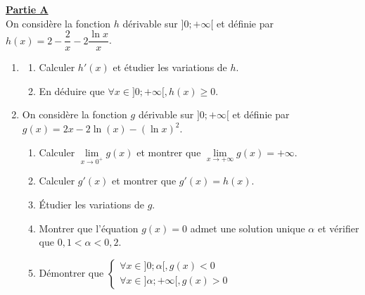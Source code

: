 \documentclass[12pt,a4paper]{article}
\begin{document}
\vspace{0.3cm}

\noindent \underline{\textbf{Partie A}} \\
On considère la fonction $h$ dérivable sur $]0; +\infty[$ et définie par $h(x) = 2 - \dfrac{2}{x} - 2\dfrac{\ln x}{x}$.
\begin{enumerate}
    \item \begin{enumerate}
        \item Calculer $h'(x)$ et étudier les variations de $h$.
        \item En déduire que $\forall x \in ]0; +\infty[, h(x) \ge 0$.
    \end{enumerate}
    \item On considère la fonction $g$ dérivable sur $]0; +\infty[$ et définie par $g(x) = 2x - 2\ln(x) - (\ln x)^2$.
    \begin{enumerate}
        \item Calculer $\lim\limits_{x \to 0^+} g(x)$ et montrer que $\lim\limits_{x \to +\infty} g(x) = +\infty$.
        \item Calculer $g'(x)$ et montrer que $g'(x) = h(x)$.
        \item Étudier les variations de $g$.
        \item Montrer que l'équation $g(x) = 0$ admet une solution unique $\alpha$ et vérifier que $0,1 < \alpha < 0,2$.
        \item Démontrer que $\begin{cases} \forall x \in ]0; \alpha[, g(x) < 0 \\ \forall x \in ]\alpha; +\infty[, g(x) > 0 \end{cases}$
    \end{enumerate}
\end{enumerate}

\vspace{0.3cm}
\end{document}
